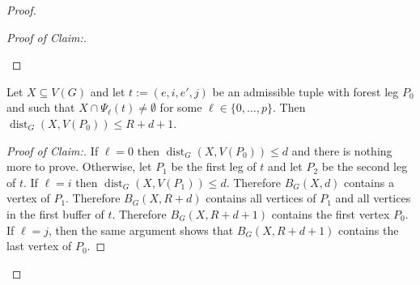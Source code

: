 \documentclass{patmorin}
\newcommand{\pat}[1]{\textcolor{Blue}{Pat: #1}}
\newenvironment{clmproof}{\begin{proof}[Proof of Claim:]\renewcommand{\qedsymbol}{\rule{1ex}{1ex}}}{\end{proof}}
\DeclareMathOperator{\dist}{dist}
\begin{document}
\begin{proof}
\begin{clmproof}
\begin{compactitem}
  \end{compactitem}
\end{clmproof}


\begin{clm}
  Let $X\subseteq V(G)$ and let $t:=(e,i,e',j)$ be an admissible tuple with forest leg $P_0$ and such that $X\cap \Psi_\ell(t)\neq\emptyset$ for some $\ell\in\{0,\ldots,p\}$.  Then $\dist_G(X,V(P_0))\le R+d+1$.
\end{clm}

\begin{clmproof}
  If $\ell=0$ then $\dist_G(X,V(P_0))\le d$ and there is nothing more to prove.
  Otherwise, let $P_1$ be the first leg of $t$ and let $P_2$ be the second leg of $t$.
  If $\ell=i$ then $\dist_G(X,V(P_1))\le d$.  Therefore $B_G(X,d)$ contains a vertex of $P_1$.  Therefore $B_G(X,R+d)$ contains all vertices of $P_1$ and all vertices in the first buffer of $t$.  Therefore $B_G(X,R+d+1)$ contains the first vertex $P_0$.
  If $\ell=j$, then the same argument shows that $B_G(X,R+d+1)$ contains the last vertex of $P_0$.
\end{clmproof}

\begin{clm}


\end{clm}
\end{proof}
\end{document}
